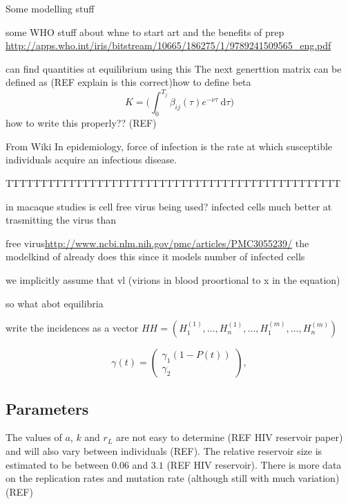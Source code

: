 \documentclass[DIV=15]{scrartcl}
\begin{document}
  Some modelling stuff \cite{diekmann1990}
  
  
  
  some WHO stuff about whne to start art and  the benefits of prep
  \url{http://apps.who.int/iris/bitstream/10665/186275/1/9789241509565_eng.pdf}
  
  
can find quantities at equilibrium using this   
  The next generttion  matrix can be defined as (REF explain is this  correct)how to define beta
  \begin{equation}
   K = \big( \int_0^{T_j}\beta_{ij}(\tau) e^{-\nu \tau} \ \text{d} \tau \big)
  \end{equation}
how to write this properly??  (REF)

From Wiki
  In epidemiology, force of infection  is the rate at which susceptible individuals acquire an infectious disease.
  
  
  
  











TTTTTTTTTTTTTTTTTTTTTTTTTTTTTTTTTTTTTTTTTTTTTTTT

in macaque studies is cell  free virus being used?
infected cells much better at trasmitting the virus than 

free virus\url{http://www.ncbi.nlm.nih.gov/pmc/articles/PMC3055239/}  the modelkind of already does this since it models number of infected cells


we implicitly assume that vl (virions in blood proortional to x in the equation)

so  what abot equilibria
 

write the incidences as a vector $HH = (H_1^{(1)},\dots,H_n^{(1)}, \dots, H_1^{(m)},\dots,H_n^{(m)})$

 \begin{equation}
\gamma (t) = \begin{pmatrix}
\gamma_1(1- P(t)) \\ \gamma_2
\end{pmatrix} , 
\label{gamma}
\end{equation}

\subsection{Parameters}
\label{Parameters}

The values of $a$, $k$ and $r_L$ are not easy to determine (REF HIV reservoir paper)
and will also vary between individuals (REF). The relative reservoir size is estimated to be between $0.06$ and $3.1$ (REF HIV reservoir). There is more data on the replication rates and mutation rate (although still with much variation) (REF)
\end{document}

